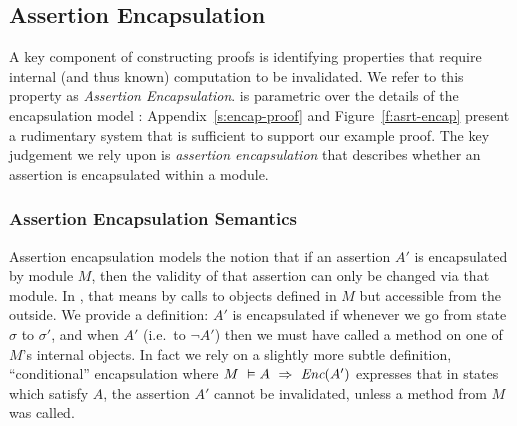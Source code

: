 \subsection {Assertion Encapsulation}
\label{s:encaps-proof}
%
{
A key component of constructing \Nec proofs 
is identifying properties that require internal (and thus known)
computation to be invalidated. 
{We refer to this property as \emph{Assertion Encapsulation}.}
}
    \Nec is parametric over the details of the encapsulation
    model \cite{TAME2003}:  Appendix~\ref{s:encap-proof} and
    Figure~\ref{f:asrt-encap}  present a 
    rudimentary system that is sufficient to support our example
    proof.  The key judgement we rely  upon is \textit{assertion
      encapsulation} that describes whether an assertion is
    encapsulated within a module. 


\subsubsection{Assertion Encapsulation Semantics}


Assertion encapsulation models the notion that if an
assertion $A'$ is encapsulated by module $M$, then the validity of that
assertion can only be changed via that module. In \Loo, that means by
calls to objects defined in $M$ but  accessible from the
outside.
%
We provide a definition: $A'$ is encapsulated if whenever
we go from state $\sigma$ to $\sigma'$, and when $A'$
 (i.e.\ to $\neg A'$) then we must have called a method on one
of $M$'s internal objects.
%
In fact we rely on a slightly more subtle  definition,
``conditional'' encapsulation where 
$M\ \vDash A\ \Rightarrow\ \textit{Enc}(A')$ expresses that in states which satisfy $A$, the assertion 
$A'$ cannot be invalidated, unless a method from $M$ was called.

